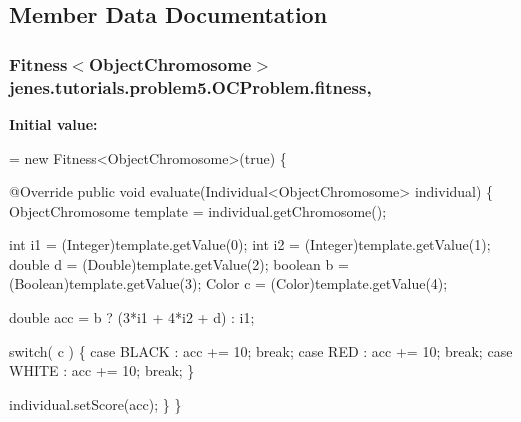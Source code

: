 \subsection{Member Data Documentation}
\hypertarget{classjenes_1_1tutorials_1_1problem5_1_1_o_c_problem_a568ec7d71c8cdcca7cb01674dac7fd62}{
\subsubsection[{fitness}]{\setlength{\rightskip}{0pt plus 5cm}Fitness$<${\bf Object\-Chromosome}$>$ jenes.\-tutorials.\-problem5.\-O\-C\-Problem.\-fitness\hspace{0.3cm}{\ttfamily [static]}, {\ttfamily [private]}}}\label{classjenes_1_1tutorials_1_1problem5_1_1_o_c_problem_a568ec7d71c8cdcca7cb01674dac7fd62}
{\bfseries Initial value\-:}
\begin{DoxyCode}
= \textcolor{keyword}{new} Fitness<ObjectChromosome>(\textcolor{keyword}{true}) \{

        @Override
        \textcolor{keyword}{public} \textcolor{keywordtype}{void} evaluate(Individual<ObjectChromosome> individual) \{
            ObjectChromosome \textcolor{keyword}{template} = individual.getChromosome();
            
            \textcolor{keywordtype}{int} i1 = (Integer)\textcolor{keyword}{template}.getValue(0);
            \textcolor{keywordtype}{int} i2 = (Integer)\textcolor{keyword}{template}.getValue(1);
            \textcolor{keywordtype}{double} d = (Double)\textcolor{keyword}{template}.getValue(2);
            \textcolor{keywordtype}{boolean} b = (Boolean)\textcolor{keyword}{template}.getValue(3);
            Color c = (Color)\textcolor{keyword}{template}.getValue(4);
            
            \textcolor{keywordtype}{double} acc = b ? (3*i1 + 4*i2 + d) : i1;
            
            \textcolor{keywordflow}{switch}( c ) \{
            \textcolor{keywordflow}{case} BLACK : acc += 10; \textcolor{keywordflow}{break};
            \textcolor{keywordflow}{case} RED   : acc += 10; \textcolor{keywordflow}{break};
            \textcolor{keywordflow}{case} WHITE : acc += 10; \textcolor{keywordflow}{break};
            \}
            
            individual.setScore(acc);
        \}        
    \}
\end{DoxyCode}

